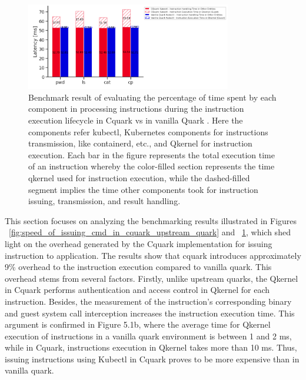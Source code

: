 \begin{figure}[H]
    \centering
    \includegraphics[width=0.8\textwidth]{images/timeshare_issuing_cmd_in_cquark_upstream_quark_kubectl.PNG}
    \caption[Benchmark result - The processing time for each component during the instruction execution lifecycle in Cquark vs in vanilla Quark]{Benchmark result of evaluating the percentage of time spent by each component in processing instructions during the instruction execution lifecycle in Cquark vs in vanilla Quark . Here 
     the components refer kubectl,  Kubernetes components for instructions transmission, like containerd, etc., and Qkernel for instruction execution. 
     Each bar in the figure represents the total execution time of an instruction whereby the color-filled section represents the time qkernel used for instruction execution, while the dashed-filled segment implies the time other components took for instruction issuing, transmission, and result handling.
    }
    \label{fig:timeshare_issuing_cmd_in_cquark_upstream_quark_kubectl}
\end{figure}


This section focuses on analyzing the benchmarking results illustrated in Figures ~\ref{fig:speed_of_issuing_cmd_in_cquark_upstream_quark} and ~\ref{fig:timeshare_issuing_cmd_in_cquark_upstream_quark_kubectl}, which shed light on the overhead generated by the Cquark implementation for issuing instruction to application. The results show that cquark introduces approximately 9\% overhead to the instruction 
execution compared to vanilla quark. This overhead stems from several factors. Firstly, unlike upstream quarks, the Qkernel in Cquark performs authentication and access control in Qkernel for each instruction. Besides, the measurement of the instruction's corresponding binary and guest system call 
interception increases the instruction execution time.  This argument is confirmed in Figure 5.1b, where the average time for Qkernel execution of instructions in a vanilla quark environment is between 1 and 2 ms, while in Cquark, instructions execution in Qkernel takes more than 10 ms. Thus, issuing 
instructions using Kubectl in Cquark proves to be more expensive than in vanilla quark.

